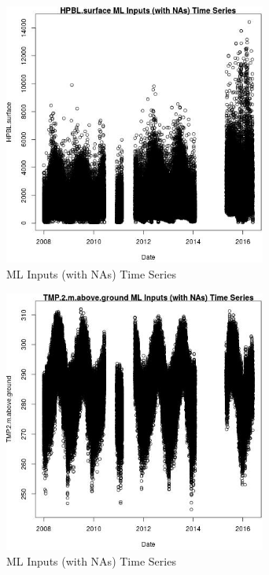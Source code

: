 \begin{figure} 
\centering  
\includegraphics[width=0.77\textwidth]{Code_Outputs/Report_ML_input_PM25_Step4_part_e_de_duplicated_aveswNAs_HPBLsurfacevDate.jpg} 
\caption{\label{fig:Report_ML_input_PM25_Step4_part_e_de_duplicated_aveswNAsHPBLsurfacevDate}ML Inputs (with NAs) Time Series} 
\end{figure} 
 

\clearpage 

\begin{figure} 
\centering  
\includegraphics[width=0.77\textwidth]{Code_Outputs/Report_ML_input_PM25_Step4_part_e_de_duplicated_aveswNAs_TMP2mabovegroundvDate.jpg} 
\caption{\label{fig:Report_ML_input_PM25_Step4_part_e_de_duplicated_aveswNAsTMP2mabovegroundvDate}ML Inputs (with NAs) Time Series} 
\end{figure} 
 

